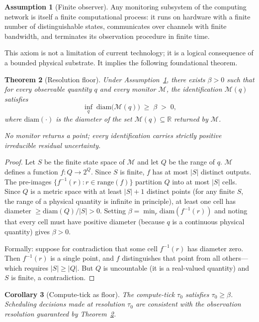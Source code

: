 \documentclass[11pt,twocolumn,a4paper]{article}
\theoremstyle{plain}
\newtheorem{theorem}{Theorem}[section]
\newtheorem{corollary}[theorem]{Corollary}
\theoremstyle{definition}
\newtheorem{assumption}[theorem]{Assumption}
\theoremstyle{remark}
\newcommand{\R}{\mathbb{R}}
\newcommand{\tick}{\tau_0}
\newcommand{\floor}{\beta}
\begin{document}
\begin{assumption}[Finite observer]
\label{ass:finite}
Any monitoring subsystem of the computing network is itself a finite computational process: it runs on hardware with a finite number of distinguishable states, communicates over channels with finite bandwidth, and terminates its observation procedure in finite time.
\end{assumption}

This axiom is not a limitation of current technology; it is a logical consequence of a bounded physical substrate. It implies the following foundational theorem.

\begin{theorem}[Resolution floor]
\label{thm:floor}
Under Assumption~\ref{ass:finite}, there exists $\floor > 0$ such that for every observable quantity $q$ and every monitor $\mathcal{M}$, the identification $\mathcal{M}(q)$ satisfies
\[
  \inf_q \;\mathrm{diam}\bigl(\mathcal{M}(q)\bigr) \;\geq\; \floor \;>\; 0,
\]
where $\mathrm{diam}(\cdot)$ is the diameter of the set $\mathcal{M}(q) \subseteq \R$ returned by $\mathcal{M}$.

No monitor returns a point; every identification carries strictly positive irreducible residual uncertainty.
\end{theorem}

\begin{proof}
Let $S$ be the finite state space of $\mathcal{M}$ and let $Q$ be the range of $q$. $\mathcal{M}$ defines a function $f : Q \to 2^Q$. Since $S$ is finite, $f$ has at most $|S|$ distinct outputs. The pre-images $\{f^{-1}(r) : r \in \mathrm{range}(f)\}$ partition $Q$ into at most $|S|$ cells. Since $Q$ is a metric space with at least $|S|+1$ distinct points (for any finite $S$, the range of a physical quantity is infinite in principle), at least one cell has diameter $\geq \mathrm{diam}(Q)/|S| > 0$. Setting $\floor = \min_{r} \mathrm{diam}(f^{-1}(r))$ and noting that every cell must have positive diameter (because $q$ is a continuous physical quantity) gives $\floor > 0$.

Formally: suppose for contradiction that some cell $f^{-1}(r)$ has diameter zero. Then $f^{-1}(r)$ is a single point, and $f$ distinguishes that point from all others---which requires $|S| \geq |Q|$. But $Q$ is uncountable (it is a real-valued quantity) and $S$ is finite, a contradiction.
\end{proof}

\begin{corollary}[Compute-tick as floor]
\label{cor:tick_floor}
The compute-tick $\tick$ satisfies $\tick \geq \floor$. Scheduling decisions made at resolution $\tick$ are consistent with the observation resolution guaranteed by Theorem~\ref{thm:floor}.
\end{corollary}
\end{document}
